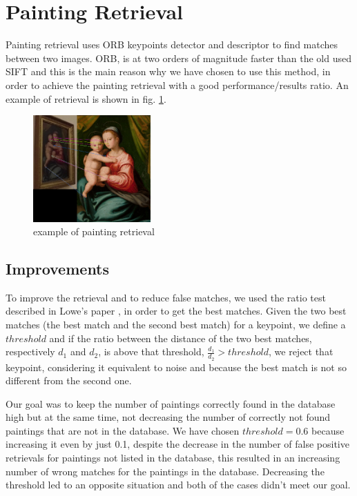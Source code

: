 \section{Painting Retrieval}
Painting retrieval uses ORB \cite{orb} keypoints detector and descriptor to find matches between two images. ORB, is at two orders of magnitude faster than the old used SIFT \cite{sift} and this is the main reason why we have chosen to use this method, in order to achieve the painting retrieval with a good performance/results ratio.
An example of retrieval is shown in fig. \ref{fig:retrieval_ex}.
\begin{figure}[h!]
    \centering
    \includegraphics[width=0.4\textwidth]{pictures/painting_retrieval/retrieval}
    \caption{example of painting retrieval}
    \label{fig:retrieval_ex}
\end{figure}

\subsection{Improvements}
To improve the retrieval and to reduce false matches, we used the ratio test described in Lowe's paper \cite{sift}, in order to get the best matches. Given the two best matches (the best match and the second best match) for a keypoint, we define a \(threshold\) and if the ratio between the distance of the two best matches, respectively \(d_1\) and \(d_2\), is above that threshold, \(\frac{d_1}{d_2}>threshold\), we reject that keypoint, considering it equivalent to noise and because the best match is not so different from the second one.

Our goal was to keep the number of paintings correctly found in the database high but at the same time, not decreasing the number of correctly not found paintings that are not in the database. We have chosen \(threshold = 0.6\) because increasing it even by just 0.1, despite the decrease in the number of false positive retrievals for paintings not listed in the database, this resulted in an increasing number of wrong matches for the paintings in the database. Decreasing the threshold led to an opposite situation and both of the cases didn't meet our goal.


